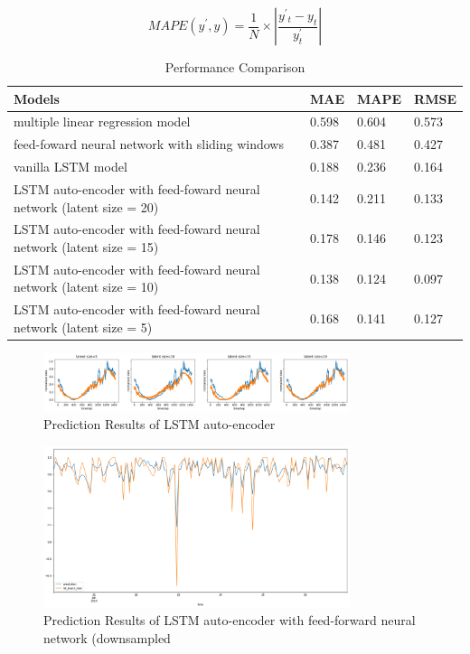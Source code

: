 \documentclass[5p]{elsarticle}
\begin{document}
\begin{equation}
	 MAPE(y^{'},y)=\frac{1}{N}\times\left| \frac{y^{'}{_t}-y_t}{y^'_t} \right|
\end{equation}

\begin{table}[]
\centering
\caption{Performance Comparison}
\label{my-label}
\begin{tabular}{|l|l|l|l|}
\hline
Models & MAE & MAPE & RMSE\\
\hline
multiple linear regression model 
& 0.598 & 0.604  & 0.573 \\
\hline
feed-foward neural network with sliding windows 
& 0.387 & 0.481  & 0.427 \\
\hline
vanilla LSTM model
& 0.188 & 0.236  & 0.164 \\
\hline
LSTM auto-encoder with feed-foward neural network (latent size = 20)& 
0.142 & 0.211  & 0.133 \\
\hline
LSTM auto-encoder with feed-foward neural network (latent size = 15)& 
0.178 & 0.146  & 0.123 \\
\hline
LSTM auto-encoder with feed-foward neural network (latent size = 10)& 
0.138 & 0.124  & 0.097 \\
\hline
LSTM auto-encoder with feed-foward neural network (latent size = 5)& 
0.168 & 0.141  & 0.127 \\
\hline    
\end{tabular}
\end{table}

\begin{figure}[h]
    \centering
    \includegraphics[width=0.8\textwidth]{lstm_auto_encoder_result.png}
    \caption{Prediction Results of LSTM auto-encoder}
    \label{fig:prediction_Results_of_LSTM_auto_encoder}
\end{figure}

\begin{figure}[h]
    \centering
    \includegraphics[width=0.8\textwidth]{result.png}
    \caption{Prediction Results of LSTM auto-encoder with feed-forward neural network (downsampled}
    \label{fig:prediction_results}
\end{figure}
\end{document}
